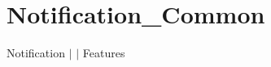 \chapter{Notification\+\_\+\+Common }
\hypertarget{md__docs_2_common_2_features_2_notification___common}{}\label{md__docs_2_common_2_features_2_notification___common}
Notification \texorpdfstring{$\vert$}{|}  \texorpdfstring{$\vert$}{|} Features



 
